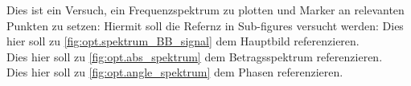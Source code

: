\documentclass[../Report.tex]{subfiles}
\begin{document}
%    
    


Dies ist ein Versuch, ein Frequenzspektrum zu plotten und Marker an relevanten Punkten zu setzen: Hiermit soll die Refernz in Sub-figures versucht werden:
Dies hier soll zu \ref{fig:opt.spektrum_BB_signal} dem Hauptbild referenzieren.\\
Dies hier soll zu \ref{fig:opt.abs_spektrum} dem Betragsspektrum referenzieren.\\
Dies hier soll zu \ref{fig:opt.angle_spektrum} dem Phasen referenzieren.\\
\end{document}
